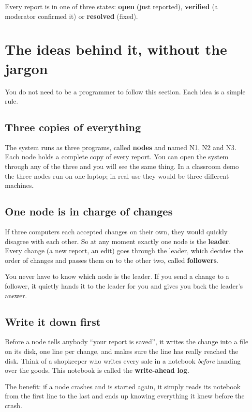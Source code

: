 \documentclass[11pt,a4paper]{article}
\newcommand{\term}[1]{\textbf{\textcolor{accent}{#1}}}
\begin{document}
Every report is in one of three states: \term{open} (just reported), \term{verified} (a moderator
confirmed it) or \term{resolved} (fixed).

\section{The ideas behind it, without the jargon}

You do not need to be a programmer to follow this section. Each idea is a simple rule.

\subsection{Three copies of everything}

The system runs as three programs, called \term{nodes} and named N1, N2 and N3. Each node holds a
complete copy of every report. You can open the system through any of the three and you will see
the same thing. In a classroom demo the three nodes run on one laptop; in real use they would be
three different machines.

\subsection{One node is in charge of changes}

If three computers each accepted changes on their own, they would quickly disagree with each
other. So at any moment exactly one node is the \term{leader}. Every change (a new report, an
edit) goes through the leader, which decides the order of changes and passes them on to the other
two, called \term{followers}.

You never have to know which node is the leader. If you send a change to a follower, it quietly
hands it to the leader for you and gives you back the leader's answer.

\subsection{Write it down first}

Before a node tells anybody ``your report is saved'', it writes the change into a file on its
disk, one line per change, and makes sure the line has really reached the disk. Think of a
shopkeeper who writes every sale in a notebook \emph{before} handing over the goods. This notebook
is called the \term{write-ahead log}.

The benefit: if a node crashes and is started again, it simply reads its notebook from the first
line to the last and ends up knowing everything it knew before the crash.
\end{document}
